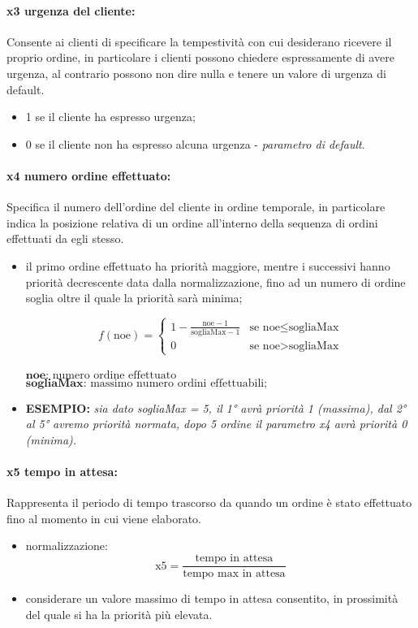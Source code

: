 \paragraph{x3 urgenza del cliente:}
Consente ai clienti di specificare la tempestività con cui desiderano ricevere il proprio ordine, in particolare i clienti possono chiedere espressamente di avere urgenza, al contrario possono non dire nulla e tenere un valore di urgenza di default.
\begin{itemize}
	\item 1 se il cliente ha espresso urgenza;
	\item 0 se il cliente non ha espresso alcuna urgenza - \textit{parametro di default}.
\end{itemize}

\paragraph{x4 numero ordine effettuato:}
Specifica il numero dell’ordine del cliente in ordine temporale, in particolare indica la posizione relativa di un ordine all'interno della sequenza di ordini effettuati da egli stesso.
\begin{itemize}
	\item il primo ordine effettuato ha priorità maggiore, mentre i successivi hanno priorità decrescente data dalla normalizzazione, fino ad un numero di ordine soglia oltre il quale la priorità sarà minima;

	\[ f(\text{noe}) = \begin{cases} 1 - \frac{{\text{noe} - 1}}{{\text{sogliaMax} - 1}} & \text{se } \text{noe} \leq \text{sogliaMax} \\ 0 & \text{se } \text{noe} > \text{sogliaMax} \end{cases} \]\\

	$\textbf{noe} \text{: numero ordine effettuato}$\\
	$\textbf{sogliaMax} \text{: massimo numero ordini effettuabili;}$

	\item \textbf{ESEMPIO: } \textit{sia dato sogliaMax = 5, il 1° avrà priorità 1 (massima), dal 2° al 5° avremo priorità normata, dopo 5 ordine il parametro x4 avrà priorità 0 (minima).}
\end{itemize}

\paragraph{x5 tempo in attesa:}
Rappresenta il periodo di tempo trascorso da quando un ordine è stato effettuato fino al momento in cui viene elaborato.
\begin{itemize}
	\item normalizzazione: \begin{equation*}
		\text{x5} = \frac{\text{tempo in attesa}}{\text{tempo max in attesa}}
	\end{equation*}
	\item considerare un valore massimo di tempo in attesa consentito, in prossimità del quale si ha la priorità più elevata.
\end{itemize}

